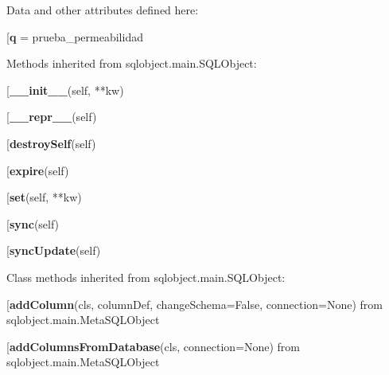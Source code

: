 Data and other attributes defined here:\\
\begin{description}\item[{\bf q} = prueba\_permeabilidad\end{description}


Methods inherited from sqlobject.main.SQLObject:\\
\begin{description}\item[{\bf \_\_init\_\_}(self, **kw)\end{description}

\begin{description}\item[{\bf \_\_repr\_\_}(self)\end{description}

\begin{description}\item[{\bf destroySelf}(self)\end{description}

\begin{description}\item[{\bf expire}(self)\end{description}

\begin{description}\item[{\bf set}(self, **kw)\end{description}

\begin{description}\item[{\bf sync}(self)\end{description}

\begin{description}\item[{\bf syncUpdate}(self)\end{description}


Class methods inherited from sqlobject.main.SQLObject:\\
\begin{description}\item[{\bf addColumn}(cls, columnDef, changeSchema=False, connection=None) from sqlobject.main.MetaSQLObject\end{description}

\begin{description}\item[{\bf addColumnsFromDatabase}(cls, connection=None) from sqlobject.main.MetaSQLObject\end{description}

